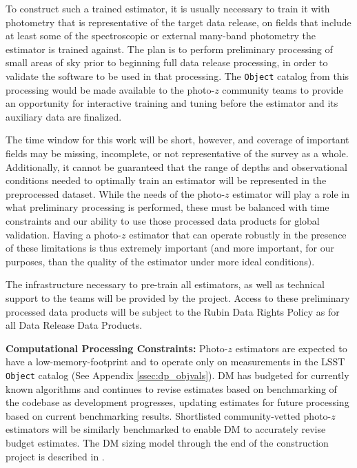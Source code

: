 \documentclass[DM,authoryear,toc]{lsstdoc}
\begin{document}
To construct such a trained estimator, it is usually necessary to train it with photometry that is representative of the target data release, on fields that include at least some of the spectroscopic or external many-band photometry the estimator is trained against.
The plan is to perform preliminary processing of small areas of sky prior to beginning full data release processing, in order to validate the software to be used in that processing.
The {\tt Object} catalog from this processing would be made available to the photo-$z$ community teams to provide an opportunity for interactive training and tuning before the estimator and its auxiliary data are finalized.

The time window for this work will be short, however, and coverage of important fields may be missing, incomplete, or not representative of the survey as a whole.
Additionally, it cannot be guaranteed that the range of depths and observational conditions needed to optimally train an estimator will be represented in the preprocessed dataset. 
While the needs of the photo-$z$ estimator will play a role in what preliminary processing is performed, these must be balanced with time constraints and our ability to use those processed data products for global validation.
Having a photo-$z$ estimator that can operate robustly in the presence of these limitations is thus extremely important (and more important, for our purposes, than the quality of the estimator under more ideal conditions).

The infrastructure necessary to pre-train all estimators, as well as technical support to the teams will be provided by the project. 
Access to these preliminary processed data products will be subject to the Rubin Data Rights Policy as for all Data Release Data Products. 
 
\textbf{Computational Processing Constraints:}
Photo-$z$ estimators are expected to have a low-memory-footprint and to operate only on measurements in the LSST {\tt Object} catalog (See Appendix \ref{ssec:dp_objvals}). 
DM has budgeted for currently known algorithms and continues to revise estimates based on benchmarking of the codebase as development progresses, updating estimates for future processing based on current benchmarking results.  
Shortlisted community-vetted photo-$z$ estimators will be similarly benchmarked to enable DM to accurately revise budget estimates. 
The DM sizing model through the end of the construction project is described in \cite{dmtn-135}.
\end{document}
